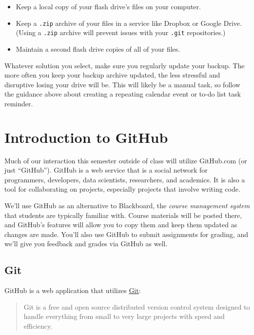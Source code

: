 \documentclass[]{book}
\providecommand{\tightlist}{%
  \setlength{\itemsep}{0pt}\setlength{\parskip}{0pt}}
\theoremstyle{definition}
\theoremstyle{definition}
\theoremstyle{definition}
\theoremstyle{remark}
\begin{document}
\begin{itemize}
\tightlist
\item
  Keep a local copy of your flash drive's files on your computer.
\item
  Keep a \texttt{.zip} archive of your files in a service like Dropbox
  or Google Drive. (Using a \texttt{.zip} archive will prevent issues
  with your \texttt{.git} repositories.)
\item
  Maintain a second flash drive copies of all of your files.
\end{itemize}

Whatever solution you select, make sure you regularly update your
backup. The more often you keep your backup archive updated, the less
stressful and disruptive losing your drive will be. This will likely be
a manual task, so follow the guidance above about creating a repeating
calendar event or to-do list task reminder.

\chapter{Introduction to GitHub}\label{introduction-to-github}

Much of our interaction this semester outside of class will utilize
GitHub.com (or just ``GitHub''). GitHub is a web service that is a
social network for programmers, developers, data scientists,
researchers, and academics. It is also a tool for collaborating on
projects, especially projects that involve writing code.

We'll use GitHub as an alternative to Blackboard, the \emph{course
management system} that students are typically familiar with. Course
materials will be posted there, and GitHub's features will allow you to
copy them and keep them updated as changes are made. You'll also use
GitHub to submit assignments for grading, and we'll give you feedback
and grades via GitHub as well.

\section{Git}\label{git}

GitHub is a web application that utilizes
\href{https://git-scm.com}{Git}:

\begin{quote}
Git is a free and open source distributed version control system
designed to handle everything from small to very large projects with
speed and efficiency.
\end{quote}
\end{document}
